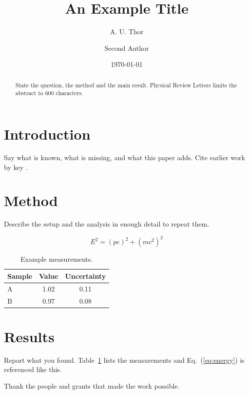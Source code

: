 \documentclass[aps,prl,reprint,amsmath,amssymb]{revtex4-2}
\begin{document}
\title{An Example Title}

\author{A. U. Thor}

\author{Second Author}

\date{\today}

\begin{abstract}
State the question, the method and the main result. Physical Review Letters
limits the abstract to 600 characters.
\end{abstract}

\maketitle

\section{Introduction}

Say what is known, what is missing, and what this paper adds. Cite earlier
work by key \cite{einstein1905,knuth1984}.

\section{Method}

Describe the setup and the analysis in enough detail to repeat them.

\begin{equation}
  E^2 = (pc)^2 + (mc^2)^2
  \label{eq:energy}
\end{equation}

\begin{table}[b]
  \caption{\label{tab:results}Example measurements.}
  \begin{ruledtabular}
    \begin{tabular}{lcc}
      Sample & Value & Uncertainty \\
      \hline
      A & 1.02 & 0.11 \\
      B & 0.97 & 0.08 \\
    \end{tabular}
  \end{ruledtabular}
\end{table}

\section{Results}

Report what you found. Table~\ref{tab:results} lists the measurements and
Eq.~(\ref{eq:energy}) is referenced like this.

\begin{acknowledgments}
Thank the people and grants that made the work possible.
\end{acknowledgments}


\end{document}
